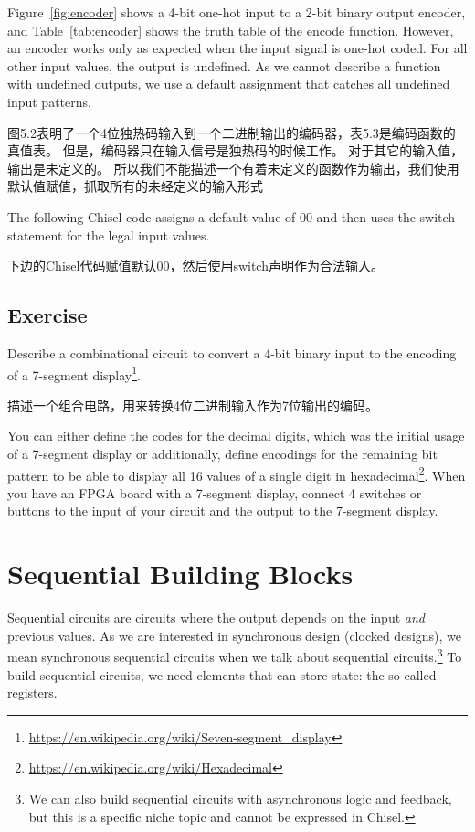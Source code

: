 \documentclass[%
    10pt,
    headinclude, footexclude,
    openright, %
    notitlepage,
    cleardoubleempty,
    headsepline,
    pointlessnumbers,
    bibtotoc, idxtotoc,
    ]{scrbook}
\newcommand{\myref}[2]{\href{#1}{#2}}
\renewcommand{\myref}[2]{{#2}{\footnote{\url{#1}}}}
\begin{document}
Figure~\ref{fig:encoder} shows a 4-bit one-hot input to a 2-bit binary output encoder, and
Table~\ref{tab:encoder} shows the truth table of the encode function. However, an encoder
works only as expected when the input signal is one-hot coded. For all other input values, the output
is undefined. As we cannot describe a function with undefined outputs, we use a default
assignment that catches all undefined input patterns.

图5.2表明了一个4位独热码输入到一个二进制输出的编码器，表5.3是编码函数的真值表。
但是，编码器只在输入信号是独热码的时候工作。
对于其它的输入值，输出是未定义的。
所以我们不能描述一个有着未定义的函数作为输出，我们使用默认值赋值，抓取所有的未经定义的输入形式

The following Chisel code assigns a default value of 00 and then uses the switch statement
for the legal input values.

下边的Chisel代码赋值默认00，然后使用switch声明作为合法输入。


\section{Exercise}

Describe a combinational circuit to convert a 4-bit binary input to the encoding of a
\myref{https://en.wikipedia.org/wiki/Seven-segment_display}{7-segment display}.

描述一个组合电路，用来转换4位二进制输入作为7位输出的编码。

You can either define the codes for the decimal digits, which was the initial
usage of a 7-segment display or additionally, define encodings for the remaining bit pattern
to be able to display all 16 values of a single digit in
\myref{https://en.wikipedia.org/wiki/Hexadecimal}{hexadecimal}.
When you have an FPGA board with a 7-segment display, connect 4 switches or
buttons to the input of your circuit and the output to the 7-segment display.

\chapter{Sequential Building Blocks}

Sequential circuits are circuits where the output depends on the input \emph{and}
previous values. As we are interested in synchronous design (clocked designs),
we mean synchronous sequential circuits when we talk about sequential
circuits.\footnote{We can also build sequential circuits with asynchronous logic and
feedback, but this is a specific niche topic and cannot be expressed in Chisel.}
To build sequential circuits, we need elements that can store state:
the so-called registers.
\end{document}
